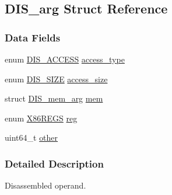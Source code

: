 \hypertarget{struct_d_i_s__arg}{\subsection{D\-I\-S\-\_\-arg Struct Reference}
\label{struct_d_i_s__arg}
}
\subsubsection*{Data Fields}
\begin{DoxyCompactItemize}
\item 
enum \hyperlink{bytecode__disasm_8h_a3dcc05be268362b3f772b1675e0a882c}{D\-I\-S\-\_\-\-A\-C\-C\-E\-S\-S} \hyperlink{struct_d_i_s__arg_a5a7d33b48f73c1d560377f10471d8b00}{access\-\_\-type}
\item 
enum \hyperlink{bytecode__disasm_8h_a6a0d419b6b61630b1f76a25ff39df84d}{D\-I\-S\-\_\-\-S\-I\-Z\-E} \hyperlink{struct_d_i_s__arg_abe85ed51a3596cdb3a868a284c3d961f}{access\-\_\-size}
\item 
struct \hyperlink{struct_d_i_s__mem__arg}{D\-I\-S\-\_\-mem\-\_\-arg} \hyperlink{struct_d_i_s__arg_a883edefb091b4875ffd7bb1f1e61dea3}{mem}
\item 
enum \hyperlink{bytecode__disasm_8h_a87af2e927a80478796188d9d8d813d82}{X86\-R\-E\-G\-S} \hyperlink{struct_d_i_s__arg_a426daf7e6de8cea3128731107457d2cf}{reg}
\item 
uint64\-\_\-t \hyperlink{struct_d_i_s__arg_aabf8b24bd58cc13ea953e9add24d4387}{other}
\end{DoxyCompactItemize}


\subsubsection{Detailed Description}
Disassembled operand. 

